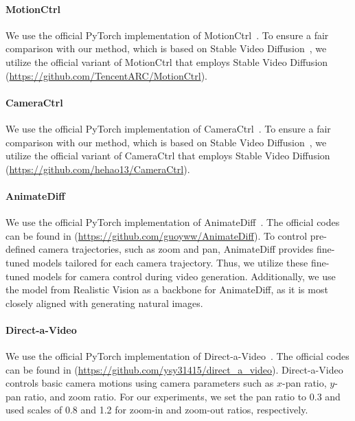 \paragraph{MotionCtrl}
We use the official PyTorch implementation of MotionCtrl~\cite{wang2024motionctrl}.
To ensure a fair comparison with our method, which is based on Stable Video Diffusion~\cite{blattmann2023stable}, we utilize the official variant of MotionCtrl that employs Stable Video Diffusion (\href{https://github.com/TencentARC/MotionCtrl}{https://github.com/TencentARC/MotionCtrl}).

\paragraph{CameraCtrl}
We use the official PyTorch implementation of CameraCtrl~\cite{he2024cameractrl}.
To ensure a fair comparison with our method, which is based on Stable Video Diffusion~\cite{blattmann2023stable}, we utilize the official variant of CameraCtrl that employs Stable Video Diffusion (\href{https://github.com/hehao13/CameraCtrl}{https://github.com/hehao13/CameraCtrl}).


\paragraph{AnimateDiff}
We use the official PyTorch implementation of AnimateDiff~\cite{guo2023animatediff}. The official codes can be found in (\href{https://github.com/guoyww/AnimateDiff}{https://github.com/guoyww/AnimateDiff}).
To control pre-defined camera trajectories, such as zoom and pan, AnimateDiff provides fine-tuned models tailored for each camera trajectory.
Thus, we utilize these fine-tuned models for camera control during video generation.
Additionally, we use the model from Realistic Vision as a backbone for AnimateDiff, as it is most closely aligned with generating natural images.

\paragraph{Direct-a-Video}
We use the official PyTorch implementation of Direct-a-Video~\cite{yang2024direct}.
The official codes can be found in (\href{https://github.com/ysy31415/direct_a_video}{https://github.com/ysy31415/direct\_a\_video}).
Direct-a-Video controls basic camera motions using camera parameters such as $x$-pan ratio, $y$-pan ratio, and zoom ratio.
For our experiments, we set the pan ratio to 0.3 and used scales of 0.8 and 1.2 for zoom-in and zoom-out ratios, respectively.







